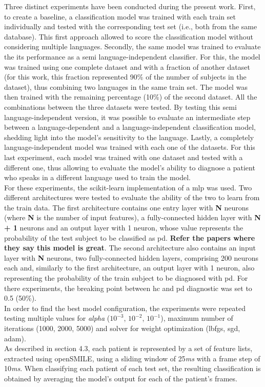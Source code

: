 Three distinct experiments have been conducted during the present work. First, to create a baseline, a classification model was trained with each train set individually and tested with the corresponding test set (i.e., both from the same database). This first approach allowed to score the classification model without considering multiple languages. Secondly, the same model was trained to evaluate the its performance as a semi language-independent classifier. For this, the model was trained using one complete dataset and with a fraction of another dataset (for this work, this fraction represented 90\% of the number of subjects in the dataset), thus combining two languages in the same train set. The model was then trained with the remaining percentage (10\%) of the second dataset. All the combinations between the three datasets were tested. By testing this semi language-independent version, it was possible to evaluate an intermediate step between a language-dependent and a language-independent classification model, shedding light into the model's sensitivity to the language. Lastly, a completely language-independent model was trained with each one of the datasets. For this last experiment, each model was trained with one dataset and tested with a different one, thus allowing to evaluate the model's ability to diagnose a patient who speaks in a different language used to train the model.
\\
For these experiments, the scikit-learn \cite{scikit-learn} implementation of a \gls{mlp} was used. Two different architectures were tested to evaluate the ability of the two to learn from the train data. The first architecture contains one entry layer with \textbf{N} neurons (where \textbf{N} is the number of input features), a fully-connected hidden layer with \textbf{N + 1} neurons and an output layer with 1 neuron, whose value represents the probability of the test subject to be classified as \gls{pd}. \textbf{Refer the papers where they say this model is great}. The second architecture also contains an input layer with \textbf{N} neurons, two fully-connected hidden layers, comprising 200 neurons each and, similarly to the first architecture, an output layer with 1 neuron, also representing the probability of the train subject to be diagnosed with \gls{pd}. For there experiments, the breaking point between \gls{hc} and \gls{pd} diagnostic was set to 0.5 (50\%).
\\
In order to find the best model configuration, the experiments were repeated testing multiple values for \textit{alpha} ($ 10^{-3} $, $ 10 ^{-2} $, $ 10 ^{-1} $), maximum number of iterations (1000, 2000, 5000) and solver for weight optimization (lbfgs, sgd, adam). 
\\
As described in section 4.3, each patient is represented by a set of feature lists, extracted using openSMILE, using a sliding window of 25\textit{ms} with a frame step of 10\textit{ms}. When classifying each patient of each test set, the resulting classification is obtained by averaging the model's output for each of the patient's frames.

